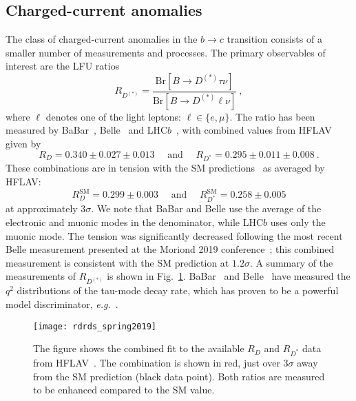 \subsection{Charged-current anomalies}
\label{sec:ch1-chargedcurrentanomalies}

The class of charged-current anomalies in the $b \to c$ transition consists of a
smaller number of measurements and processes. The primary observables of
interest are the LFU ratios
\begin{equation}
  R_{D^{(*)}} = \frac{\mathrm{Br}[B \to D^{(*)} \tau \nu]}{\mathrm{Br}[B \to D^{(*)} \ell \nu]} \ ,
\end{equation}
where $\ell$ denotes one of the light leptons: $\ell \in \{e, \mu\}$. The ratio
has been measured by BaBar~\cite{Lees:2012xj, Lees:2013uzd},
Belle~\cite{Huschle:2015rga, Hirose:2016wfn, Hirose:2017dxl, Abdesselam:2019dgh}
and LHC$b$~\cite{Aaij:2015yra, Aaij:2017uff, Aaij:2017deq}, with combined values
from HFLAV given by~\cite{Amhis:2019ckw}
\begin{equation}
  R_{D} = 0.340 \pm 0.027 \pm 0.013\quad \text{ and }\quad R_{D^{*}} = 0.295 \pm 0.011 \pm 0.008 \ .
\end{equation}
These combinations are in tension with the SM predictions~\cite{Bigi:2016mdz,
  Bernlochner:2017jka, Bigi:2017jbd, Jaiswal:2017rve} as averaged by HFLAV:
\begin{equation}
  R^{\text{SM}}_{D} = 0.299 \pm 0.003\quad \text{ and }\quad R^{\text{SM}}_{D^{*}} = 0.258 \pm 0.005
\end{equation}
at approximately $3\sigma$. We note that BaBar and Belle use the average of the
electronic and muonic modes in the denominator, while LHC$b$ uses only the
muonic mode. The tension was significantly decreased following the most recent
Belle measurement presented at the Moriond 2019
conference~\cite{Abdesselam:2019dgh}; this combined measurement is consistent
with the SM prediction at $1.2\sigma$. A summary of the measurements of
$R_{D^{(*)}}$ is shown in Fig.~\ref{fig:ch1-rd-rdstar-hflav}.
BaBar~\cite{Lees:2013uzd} and Belle~\cite{Huschle:2015rga} have measured the
$q^{2}$ distributions of the tau-mode decay rate, which has proven to be a
powerful model discriminator, \textit{e.g.}~\cite{Freytsis:2015qca}.

\begin{figure}[t]
  \centering
  \texttt{[image: rdrds\_spring2019]}
  \caption[The figure shows the combined fit to the available $R_{D}$ and
  $R_{D^{*}}$ data from HFLAV~\cite{Amhis:2019ckw}.]{The figure shows the
    combined fit to the available $R_{D}$ and $R_{D^{*}}$ data from
    HFLAV~\cite{Amhis:2019ckw}. The combination is shown in red, just over
    $3\sigma$ away from the SM prediction (black data point). Both ratios are
    measured to be enhanced compared to the SM value.}
  \label{fig:ch1-rd-rdstar-hflav}
\end{figure}

